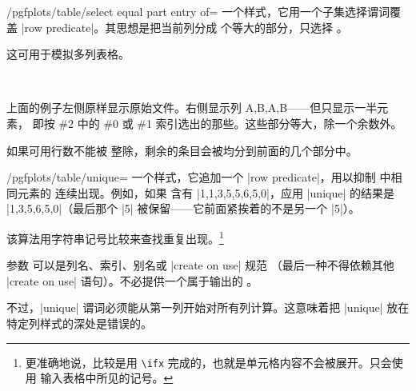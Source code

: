 \documentclass[a4paper,doc2]{ltxdoc}
\begin{document}
\begin{stylekey}{/pgfplots/table/select equal part entry of=}
    一个样式，它用一个子集选择谓词覆盖 |row predicate|。其思想是把当前列分成
     个等大的部分，只选择 。

    这可用于模拟多列表格。
\begin{codeexample}[]

%
~
\end{codeexample}
    上面的例子左侧原样显示原始文件。右侧显示列 A,B,A,B——但只显示一半元素，
    即按 \#2 中的 \#0 或 \#1 索引选出的那些。这些部分等大，除一个余数外。

    如果可用行数不能被  整除，剩余的条目会被均分到前面的几个部分中。
\end{stylekey}

\begin{stylekey}{/pgfplots/table/unique=}
    一个样式，它追加一个 |row predicate|，用以抑制  中相同元素的
    连续出现。例如，如果  含有 |1,1,3,5,5,6,5,0|，应用 |unique|
    的结果是 |1,3,5,6,5,0|（最后那个 |5| 被保留——它前面紧挨着的不是另一个 |5|）。

    该算法用字符串记号比较来查找重复出现。\footnote{更准确地说，比较是用
    \texttt{\textbackslash ifx} 完成的，也就是单元格内容不会被展开。只会使用
    输入表格中所见的记号。}

    参数  可以是列名、索引、别名或 |create on use| 规范
    （最后一种不得依赖其他 |create on use| 语句）。不必提供一个属于输出的
    。

    不过，|unique| 谓词必须能从第一列开始对所有列计算。这意味着把 |unique| 放在
    特定列样式的深处是错误的。
\end{stylekey}
\end{document}
